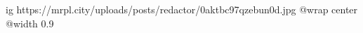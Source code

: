  
 
 
 
 

\ifcmt
  ig https://mrpl.city/uploads/posts/redactor/0aktbc97qzebun0d.jpg
  @wrap center
  @width 0.9
\fi
